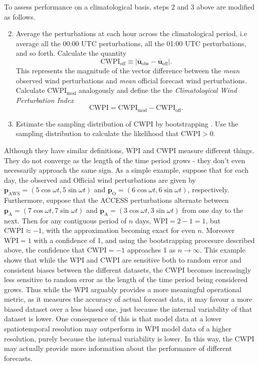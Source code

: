 \documentclass[alpha-refs]{wiley-article}
\begin{document}
To assess performance on a climatological basis, steps 2 and 3 above are modified as follows. 
\begin{enumerate}
\setcounter{enumi}{1}
\item
Average the perturbations at each hour across the climatological period, i.e average all the 00:00 UTC perturbations, all the 01:00 UTC perturbations, and so forth. Calculate the quantity
\begin{equation}
\text{CWPI}_{\text{off}} \equiv \left\lvert \overline{\boldsymbol{u}}_{\text{obs}}-\overline{\boldsymbol{u}}_{\text{off}} \right\rvert.
\end{equation}
This represents the magnitude of the vector difference between the \emph{mean} 
observed wind perturbations and \emph{mean} official forecast wind perturbations. Calculate \(\text{CWPI}_{\text{mod}}\) analogously and define the the \emph{Climatological Wind Perturbation Index}
\begin{equation}
\text{CWPI} = \text{CWPI}_{\text{mod}} - \text{CWPI}_{\text{off}}.
\end{equation}
\item
Estimate the sampling distribution of \(\text{CWPI}\) by bootstrapping
\citep{efron79}. Use the sampling distribution to calculate the likelihood that $\text{CWPI} > 0$.  
\end{enumerate}

Although they have similar definitions, $\overline{\text{WPI}}$ and CWPI measure different things. They do not converge as the length of the time period grows - they don't even necessarily approach the same sign. As a simple example, suppose that for each day, the observed and Official wind perturbations are given by $\boldsymbol{p}_{\text{AWS}} = \left(5\cos\omega t , 5\sin\omega t\right)$ and $\boldsymbol{p}_\text{O} = \left(6\cos\omega t , 6\sin\omega t\right)$, respectively. Furthermore, suppose that the ACCESS perturbations alternate between $\boldsymbol{p}_{\text{A}} = \left(7\cos\omega t , 7\sin\omega t\right)$ and $\boldsymbol{p}_{\text{A}} = \left(3\cos\omega t , 3\sin\omega t\right)$ from one day to the next. Then for any contiguous period of $n$ days, $\overline{\text{WPI}} = 2 - 1 = 1$, but $\text{CWPI} \approx -1$, with the approximation becoming exact for even $n$. Moreover $\overline{\text{WPI}}=1$ with a confidence of 1, and using the bootstrapping procesure described above, the confidence that $\text{CWPI} = -1$ approaches 1 as $n\to \infty$. This example shows that while the WPI and CWPI are sensitive both to random error and consistent biases between the different datasets, the CWPI becomes increasingly less sensitive to random error as the length of the time period being considered grows. Thus while the WPI arguably provides a more meaningful operational metric, as it measures the accuracy of actual forecast data, it may favour a more biased dataset over a less biased one, just because the internal variability of that dataset is lower. One consequence of this is that model data at a lower spatiotemporal resolution may outperform in $\overline{\text{WPI}}$ model data of a higher resolution, purely because the internal variability is lower. In this way, the CWPI may actually provide more information about the performance of different forecasts.
\end{document}
